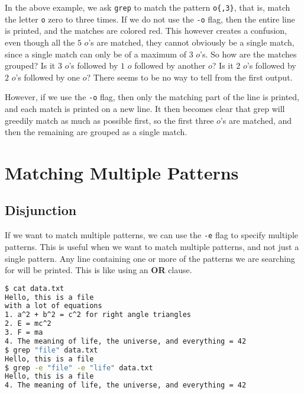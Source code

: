 In the above example, we ask \lstinline|grep| to match the pattern \lstinline|o{,3}|, that is, match the letter \lstinline|o| zero to three times. If we do not use the \lstinline|-o| flag, then the entire line is printed, and the matches are colored red. This however creates a confusion, even though all the $5$ $o$'s are matched, they cannot obviously be a single match, since a single match can only be of a maximum of $3$ $o$'s. So how are the matches grouped? Is it $3$ $o$'s followed by $1$ $o$ followed by another $o$? Is it $2$ $o$'s followed by $2$ $o$'s followed by one $o$? There seems to be no way to tell from the first output.

However, if we use the \lstinline|-o| flag, then only the matching part of the line is printed, and each match is printed on a new line. It then becomes clear that grep will greedily match as much as possible first, so the first three $o$'s are matched, and then the remaining are grouped as a single match.

\section{Matching Multiple Patterns}

\subsection{Disjunction}

If we want to match multiple patterns, we can use the \lstinline|-e| flag to specify multiple patterns. This is useful when we want to match multiple patterns, and not just a single pattern. Any line containing one or more of the patterns we are searching for will be printed. This is like using an \textbf{OR} clause.

\begin{lstlisting}[language=bash]
$ cat data.txt
Hello, this is a file
with a lot of equations
1. a^2 + b^2 = c^2 for right angle triangles
2. E = mc^2
3. F = ma
4. The meaning of life, the universe, and everything = 42
$ grep "file" data.txt
Hello, this is a file
$ grep -e "file" -e "life" data.txt
Hello, this is a file
4. The meaning of life, the universe, and everything = 42
\end{lstlisting}

